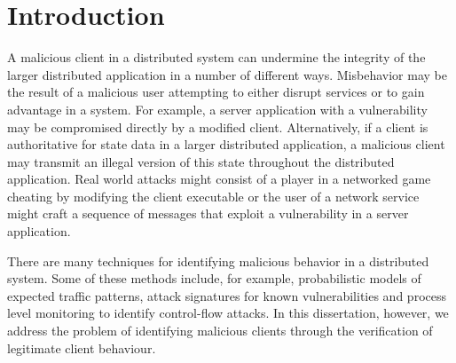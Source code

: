 \chapter{Introduction} 
\label{ch:introduction}

A malicious client in a distributed system can undermine the integrity
of the larger distributed application in a number of different ways.
Misbehavior may be the result of a malicious user attempting to either
disrupt services or to gain advantage in a system. For example, a
server application with a vulnerability may be compromised directly by
a modified client. Alternatively, if a client is authoritative for
state data in a larger distributed application, a malicious client may
transmit an illegal version of this state throughout the distributed
application. Real world attacks might consist of a player in a
networked game cheating by modifying the client executable or the user
of a network service might craft a sequence of messages that exploit a
vulnerability in a server application.

There are many techniques for identifying malicious behavior in a
distributed system. Some of these methods include, for example,
probabilistic models of expected traffic patterns, attack signatures
for known vulnerabilities and process level monitoring to identify
control-flow attacks. In this dissertation, however, we address the
problem of identifying malicious clients through the verification
of legitimate client behaviour.

%
%
%



